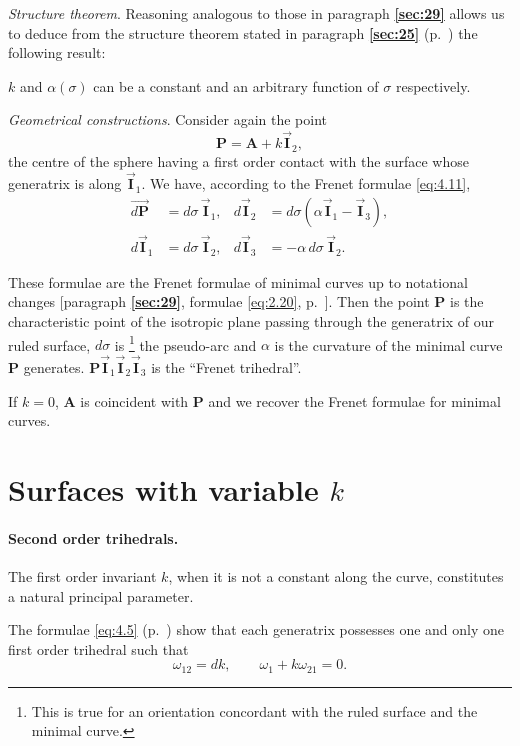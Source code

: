 \documentclass[leqno,11pt]{book}
\numberwithin{equation}{chapter}
\theoremstyle{shape1}
\theoremstyle{shapesmall}
\newcommand{\fsref}[1]{{\rm\textsection\textbf{\ref{sec:#1}}}}
\newcommand{\rvec}[1]{\vec{\mathbf{#1}}}
\newcommand{\ivec}{\rvec{I}}
\newcommand{\somespace}{\vspace{9pt}}
\begin{document}
\somespace

\emph{Structure theorem}. Reasoning analogous to those in paragraph \fsref{29} allows us to deduce from the structure theorem stated in paragraph \fsref{25} (p.~\pageref{sec:25}) the following result:

\somespace

$k$ and $\alpha(\sigma)$ can be a constant and an arbitrary function of $\sigma$ respectively.

\somespace

\emph{Geometrical constructions}. Consider again the point
\[
\mathbf{P}=\mathbf{A}+k\ivec_{2},
\]
the centre of the sphere having a first order contact with the surface whose generatrix is along $\ivec_1
$. We have, according to the Frenet formulae \eqref{eq:4.11},
\begin{align*}
  \overrightarrow{d\mathbf{P}}&=d\sigma\,\ivec_{1},&d\ivec_{2}&=d\sigma(\alpha\ivec_{1}-\ivec_{3}),\\
  d\ivec_{1}&=d\sigma\,\ivec_{2},&d\ivec_{3}&=-\alpha\,d\sigma\,\ivec_{2}.
\end{align*}

These formulae are the Frenet formulae of minimal curves up to notational changes [paragraph \fsref{29}, formulae \eqref{eq:2.20}, p.~\pageref{eq:2.20}]. Then the point $\mathbf{P}$ is the characteristic point of the isotropic plane passing through the generatrix of our ruled surface, $d\sigma$ is \footnote{This is true for an orientation concordant with the ruled surface and the minimal curve.} the pseudo-arc and $\alpha$ is the curvature of the minimal curve $\mathbf{P}$ generates. $\mathbf{P}\ivec_{1}\ivec_{2}\ivec_{3}$ is the ``Frenet trihedral''.

If $k=0$, $\mathbf{A}$ is coincident with $\mathbf{P}$ and we recover the Frenet formulae for minimal curves.

\section{Surfaces with variable $k$}
\label{sec:surf-with-vari}

\paragraph{Second order trihedrals.}
\label{sec:56}
The first order invariant $k$, when it is not a constant along the curve, constitutes a natural principal parameter.

The formulae \eqref{eq:4.5} (p.~\pageref{eq:4.5}) show that each generatrix possesses one and only one first order trihedral such that
\begin{equation}
  \label{eq:4.12}
  \omega_{12}=dk,\qquad\omega_{1}+k\omega_{21}=0.
\end{equation}
\end{document}
